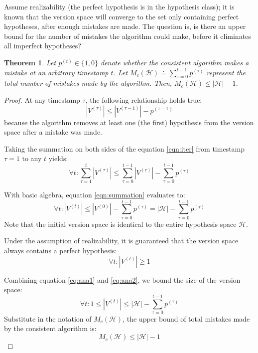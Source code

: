 \documentclass[11pt]{article}
\newtheorem{theorem}{Theorem}
\begin{document}
Assume realizability (the perfect hypothesis is in the hypothesis class); it is known that the version space will converge to the set only containing perfect hypotheses, after enough mistakes are made. The question is, is there an upper bound for the number of mistakes the algorithm could make, before it eliminates all imperfect hypotheses? 

\begin{theorem}
Let $p^{(t)}\in\{1,0\}$ denote whether the consistent algorithm makes a mistake at an arbitrary timestamp $t$. Let $M_c(\mathcal{H})\doteq\sum_{\tau=0}^{t-1}p^{(\tau)}$ represent the total number of mistakes made by the algorithm. Then, $M_c(\mathcal{H})\leq |\mathcal{H}|-1$.
\end{theorem}

\begin{proof}
At any timestamp $\tau$, the following relationship holds true:
\begin{equation}
    |V^{(\tau)}|\leq|V^{(\tau-1)}|-p^{(\tau-1)}
    \label{eqn:iter}
\end{equation}
because the algorithm removes at least one (the first) hypothesis from the version space after a mistake was made.

Taking the summation on both sides of the equation \ref{eqn:iter} from timestamp $\tau=1$ to any $t$ yields:
\begin{equation}
    \forall t:\sum_{\tau=1}^t|V^{(\tau)}|\leq \sum_{\tau=0}^{t-1}|V^{(\tau)}|-\sum_{\tau=0}^{t-1}p^{(\tau)}
    \label{eqn:summation}
\end{equation}

With basic algebra, equation \ref{eqn:summation} evaluates to:
\begin{equation}
    \forall t:|V^{(t)}|\leq |V^{(0)}|-\sum_{\tau=0}^{t-1}p^{(\tau)}=|\mathcal{H}|-\sum_{\tau=0}^{t-1}p^{(\tau)}
    \label{eq:ana1}
\end{equation}
Note that the initial version space is identical to the entire hypothesis space $\mathcal{H}$.

Under the assumption of realizability, it is guaranteed that the version space always contains a perfect hypothesis:
\begin{equation}
    \forall t: |V^{(t)}|\geq 1
    \label{eq:ana2}
\end{equation}

Combining equation \ref{eq:ana1} and \ref{eq:ana2}, we bound the size of the version space:
\begin{equation}
    \forall t: 1\leq|V^{(t)}|\leq |\mathcal{H}|-\sum_{\tau=0}^{t-1}p^{(\tau)}
\end{equation}
Substitute in the notation of $M_c(\mathcal{H})$, the upper bound of total mistakes made by the consistent algorithm is:
\begin{equation}
    M_c(\mathcal{H})\leq |\mathcal{H}|-1
\end{equation}
\end{proof}
\end{document}
